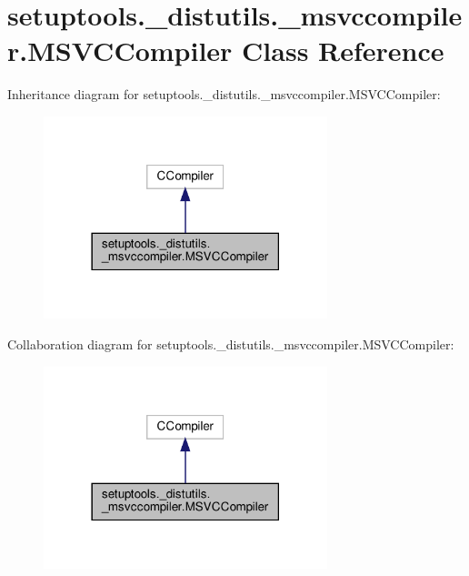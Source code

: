 \hypertarget{classsetuptools_1_1__distutils_1_1__msvccompiler_1_1MSVCCompiler}{}\section{setuptools.\+\_\+distutils.\+\_\+msvccompiler.\+M\+S\+V\+C\+Compiler Class Reference}
\label{classsetuptools_1_1__distutils_1_1__msvccompiler_1_1MSVCCompiler}


Inheritance diagram for setuptools.\+\_\+distutils.\+\_\+msvccompiler.\+M\+S\+V\+C\+Compiler\+:
\nopagebreak
\begin{figure}[H]
\begin{center}
\leavevmode
\includegraphics[width=234pt]{classsetuptools_1_1__distutils_1_1__msvccompiler_1_1MSVCCompiler__inherit__graph}
\end{center}
\end{figure}


Collaboration diagram for setuptools.\+\_\+distutils.\+\_\+msvccompiler.\+M\+S\+V\+C\+Compiler\+:
\nopagebreak
\begin{figure}[H]
\begin{center}
\leavevmode
\includegraphics[width=234pt]{classsetuptools_1_1__distutils_1_1__msvccompiler_1_1MSVCCompiler__coll__graph}
\end{center}
\end{figure}
